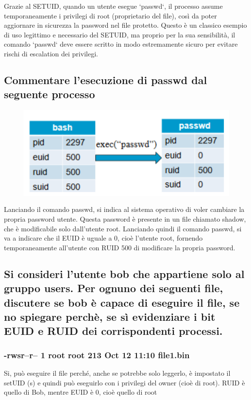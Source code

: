 \documentclass{report}
\begin{document}
\noindent Grazie al SETUID, quando un utente esegue `passwd`, il processo assume temporaneamente i privilegi di root (proprietario del file), così da poter aggiornare in sicurezza la password nel file protetto. Questo è un classico esempio di uso legittimo e necessario del SETUID, ma proprio per la sua sensibilità, il comando `passwd` deve essere scritto in modo estremamente sicuro per evitare rischi di escalation dei privilegi.

\subsection{Commentare l'esecuzione di passwd dal seguente processo}
\begin{figure}[H]
    \centering
    \includegraphics[width=0.8\linewidth]{images/psswd.png}
\end{figure}
Lanciando il comando passwd, si indica al sistema operativo di voler cambiare la propria password utente. Questa password è presente in un file chiamato shadow, che è modificabile solo dall'utente root.
Lanciando quindi il comando passwd, si va a indicare che il EUID è uguale a 0, cioè l'utente root, fornendo temporaneamente all'utente con RUID 500 di modificare la propria password.

\subsection{Si consideri l'utente bob che appartiene solo al gruppo users. Per ognuno dei seguenti file, discutere se bob è capace di eseguire il file, se no spiegare perchè, se sì evidenziare i bit EUID e RUID dei corrispondenti processi.}
\subsubsection{-rwsr--r-- 1 root root 213 Oct 12 11:10 file1.bin}
Si, può eseguire il file perché, anche se potrebbe solo leggerlo, è impostato il setUID (s) e quindi può eseguirlo con i privilegi del owner (cioè di root). RUID è quello di Bob, mentre EUID è 0, cioè quello di root
\end{document}
